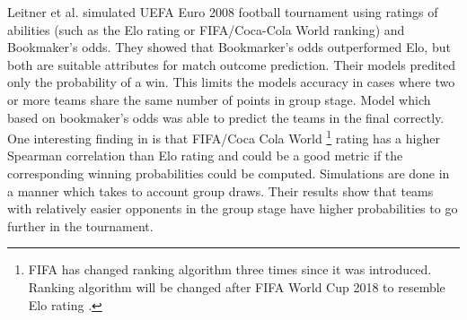 Leitner et al. \cite{leitner2010forecasting} simulated UEFA Euro 2008 football tournament using ratings of abilities (such as the Elo rating or FIFA/Coca-Cola World ranking) and Bookmaker's odds. They showed that Bookmarker's odds outperformed Elo, but both are suitable attributes for match outcome prediction. Their models predited only the probability of a win. This limits the models accuracy in cases where two or more teams share the same number of points in group stage. Model which based on bookmaker's odds was able to predict the teams in the final correctly. One interesting finding in \cite{leitner2010forecasting} is that FIFA/Coca Cola World \footnote{FIFA has changed ranking algorithm three times since it was introduced. Ranking algorithm will be changed after FIFA World Cup 2018 to resemble Elo rating \cite{wiki:fifarating}.} rating has a higher Spearman correlation than Elo rating and could be a good metric if the corresponding winning probabilities could be computed. Simulations are done in a manner which takes to account group draws. Their results show that teams with relatively easier opponents in the group stage have higher probabilities to go further in the tournament.

